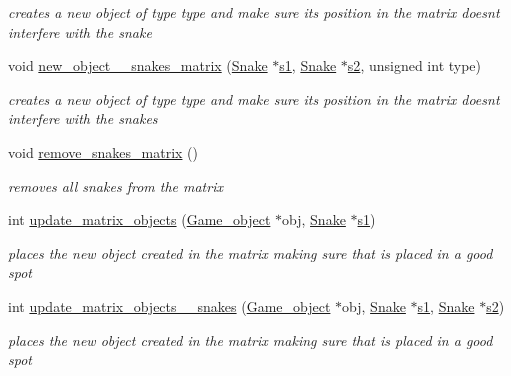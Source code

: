\begin{DoxyCompactItemize}
\begin{DoxyCompactList}\small\item\em creates a new object of type type and make sure its position in the matrix doesnt interfere with the snake \end{DoxyCompactList}\item 
void \hyperlink{group__graphics_gaa03ab4855ae73e5b616cf76f54de6f76}{new\+\_\+object\+\_\+\_\+snakes\+\_\+matrix} (\hyperlink{structSnake}{Snake} $\ast$\hyperlink{group__man__events_gaf79c0d77b0cca9ebf96bbbed1f88aed0}{s1}, \hyperlink{structSnake}{Snake} $\ast$\hyperlink{group__man__events_ga5b853e8b22f27ef547e5b45e4197d308}{s2}, unsigned int type)
\begin{DoxyCompactList}\small\item\em creates a new object of type type and make sure its position in the matrix doesnt interfere with the snakes \end{DoxyCompactList}\item 
void \hyperlink{group__graphics_gac6b9fb650a2fb880335948e9ef3fdf82}{remove\+\_\+snakes\+\_\+matrix} ()
\begin{DoxyCompactList}\small\item\em removes all snakes from the matrix \end{DoxyCompactList}\item 
int \hyperlink{group__graphics_gad40d6fc4b95f03cf67fff31597a2bada}{update\+\_\+matrix\+\_\+objects} (\hyperlink{structGame__object}{Game\+\_\+object} $\ast$obj, \hyperlink{structSnake}{Snake} $\ast$\hyperlink{group__man__events_gaf79c0d77b0cca9ebf96bbbed1f88aed0}{s1})
\begin{DoxyCompactList}\small\item\em places the new object created in the matrix making sure that is placed in a good spot \end{DoxyCompactList}\item 
int \hyperlink{group__graphics_ga15209d618a0ee6164a1b1c7f72ba5bdf}{update\+\_\+matrix\+\_\+objects\+\_\+\_\+snakes} (\hyperlink{structGame__object}{Game\+\_\+object} $\ast$obj, \hyperlink{structSnake}{Snake} $\ast$\hyperlink{group__man__events_gaf79c0d77b0cca9ebf96bbbed1f88aed0}{s1}, \hyperlink{structSnake}{Snake} $\ast$\hyperlink{group__man__events_ga5b853e8b22f27ef547e5b45e4197d308}{s2})
\begin{DoxyCompactList}\small\item\em places the new object created in the matrix making sure that is placed in a good spot \end{DoxyCompactList}\item 

\end{DoxyCompactItemize}
